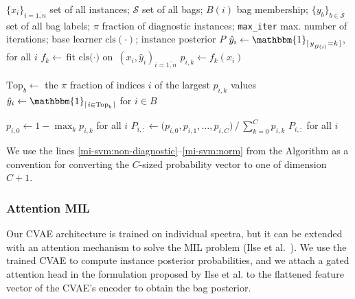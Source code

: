 \documentclass[12pt]{article}
\theoremstyle{paper}
\begin{document}
 \begin{algorithm}[H]
\caption{mi-SVM}
\label{alg:misvm}
\begin{algorithmic}[1]
\Require 
    $\{x_i\}_{i=\overline{1,n}}$ set of all instances; 
    $\mathcal{S}$ set of all bags;
    $B(i)$ bag membership; 
    $\{y_b\}_{b \in \mathcal{S}}$ set of all bag labels;
    $\pi$ fraction of diagnostic instances; 
    \texttt{max\_iter} max. number of iterations;
    base learner $\text{cls}(\cdot)$;
\Ensure instance posterior $P$
\State $\hat y_i \gets \mathbbm{1}_{[\,y_{_{B(i)}} = k\,]}$, for all $i$ 
\Do
  \State $f_k \gets \text{fit cls($\cdot$) on } (x_i,\hat y_i)_{i=\overline{1,n}}$
  \State $p_{i,k} \gets f_k(x_i)$ 
  
    \State $\mathrm{Top}_b \gets$ the $\pi$ fraction of indices $i$ of the largest $p_{i,k}$ values
    \State $\hat y_i \gets \mathbbm{1}_{[\,i \in \mathrm{Top}_b\,]}$ for $i \in B$ 
  \EndFor
  
\EndFor
\State \label{mi-svm:non-diagnostic} $p_{i,0} \gets 1 - \max_{k} p_{i,k}$ for all $i$ 
\State \label{mi-svm:norm} $P_{i,:} \gets \big(p_{i,0}, p_{i,1}, \ldots, p_{i,C}\big) \,/\, \textstyle\sum_{k=0}^{C} p_{i,k}$ 
\State \Return $P_{i,:}$ for all $i$
\end{algorithmic}
\end{algorithm}

We use the lines \ref{mi-svm:non-diagnostic}--\ref{mi-svm:norm} from the Algorithm  as a convention for converting the $C$-sized probability vector to one of dimension $C+1$. 

\subsubsection{Attention MIL}
Our CVAE architecture is trained on individual spectra, but it can be extended with an attention mechanism to solve the MIL problem (Ilse et al.~\cite{ilse2018attention}). We use the trained CVAE to compute instance posterior probabilities, and we attach a gated attention head in the formulation proposed by Ilse et al. to the flattened feature vector of the CVAE's encoder to obtain the bag posterior. 
\end{document}
